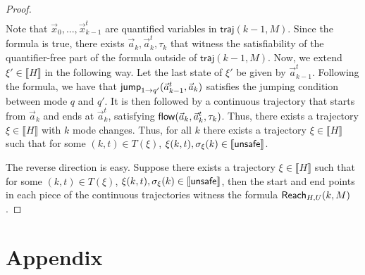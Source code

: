 \documentclass[journal]{IEEEtran}
\newcommand{\traj}{\mathsf{traj}}
\begin{document}
\begin{proof}
\begin{eqnarray*}
\end{eqnarray*}
Note that $\vec x_0,...,\vec x_{k-1}^t$ are quantified variables in $\traj(k-1,M)$. Since the formula is true, there exists $\vec a_{k}, \vec a_k^t, \tau_k$ that witness the satisfiability of the quantifier-free part of the formula outside of $\traj(k-1,M)$. Now, we extend $\xi'\in\llbracket H\rrbracket$ in the following way. Let the last state of $\xi'$ be given by $\vec a^t_{k-1}$. Following the formula, we have that $\mathsf{jump}_{1\rightarrow q'}(\vec a_{k-1}^t, \vec a_k)$ satisfies the jumping condition between mode $q$ and $q'$. It is then followed by a continuous trajectory that starts from $\vec a_k$ and ends at $\vec a_k^t$, satisfying $\mathsf{flow}(\vec a_k, \vec a_k^t, \tau_k)$. Thus, there exists a trajectory $\xi\in \llbracket H\rrbracket$ with $k$ mode changes. Thus, for all $k$ there exists a trajectory $\xi\in \llbracket H\rrbracket$ such that for some $(k,t)\in T(\xi)$, $\xi(k,t),\sigma_{\xi}(k)\in \llbracket \mathsf{unsafe}\rrbracket$.

The reverse direction is easy. Suppose there exists a trajectory $\xi\in \llbracket H\rrbracket$ such that for some $(k,t)\in T(\xi)$, $\xi(k,t),\sigma_{\xi}(k)\in \llbracket \mathsf{unsafe}\rrbracket$, then the start and end points in each piece of the continuous trajectories witness the formula $\mathsf{Reach}_{H,U}(k,M)$.

\end{proof}


\appendices
\section*{Appendix}
\end{document}

